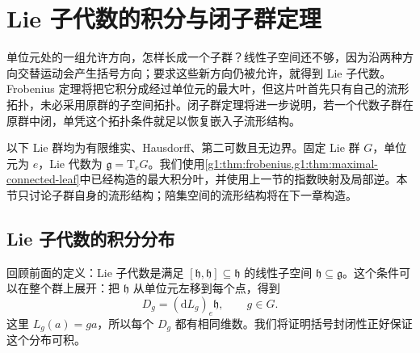 
% 
% 

\section{Lie 子代数的积分与闭子群定理}
\label{g1:sec:1603}

单位元处的一组允许方向，怎样长成一个子群？线性子空间还不够，因为沿两种方向交替运动会产生括号方向；要求这些新方向仍被允许，就得到 Lie 子代数。Frobenius 定理将把它积分成经过单位元的最大叶，但这片叶首先只有自己的流形拓扑，未必采用原群的子空间拓扑。闭子群定理将进一步说明，若一个代数子群在原群中闭，单凭这个拓扑条件就足以恢复嵌入子流形结构。

\ProseParagraphBreak

以下 Lie 群均为有限维实、Hausdorff、第二可数且无边界。固定 Lie 群 \(G\)，单位元为 \(e\)，Lie 代数为 \(\mathfrak g=\mathrm{T}_eG\)。我们使用\cref{g1:thm:frobenius,g1:thm:maximal-connected-leaf}中已经构造的最大积分叶，并使用上一节的指数映射及局部逆。本节只讨论子群自身的流形结构；陪集空间的流形结构将在下一章构造。

\subsection{Lie 子代数的积分分布}
\label{g1:subsec:1603:01}

回顾前面的定义：Lie 子代数是满足 \([\mathfrak h,\mathfrak h]\subseteq\mathfrak h\) 的线性子空间 \(\mathfrak h\subseteq\mathfrak g\)。这个条件可以在整个群上展开：把 \(\mathfrak h\) 从单位元左移到每个点，得到
\begin{equation}\label{g1:eq:subalgebra-left-distribution}
	D_g=(\mathrm{d}L_g)_e\mathfrak h,\qquad g\in G.
\end{equation}
这里 \(L_g(a)=ga\)，所以每个 \(D_g\) 都有相同维数。我们将证明括号封闭性正好保证这个分布可积。

